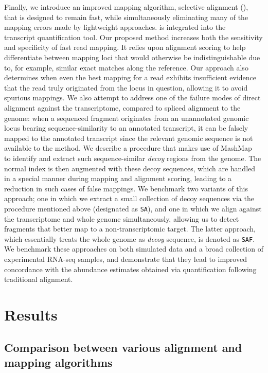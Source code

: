 Finally, we introduce an improved mapping algorithm, selective alignment (\hsa),
that is designed to remain fast, while simultaneously eliminating many of the
mapping errors made by lightweight approaches. \hsa is integrated into the \salmon~\cite{salmon}
transcript quantification tool. Our proposed method increases
both the sensitivity and specificity of fast read mapping. It relies upon
alignment scoring to help differentiate between mapping loci that would
otherwise be indistinguishable due to, for example, similar exact matches along
the reference. Our approach also determines when even the best mapping for a
read exhibits insufficient evidence that the read truly originated from the
locus in question, allowing it to avoid spurious mappings. 
We also attempt to address one of the failure modes of direct alignment against
  the transcriptome, compared to spliced alignment to the genome: when a sequenced fragment originates
  from an unannotated genomic locus bearing sequence-similarity to an annotated
  transcript, it can be falsely mapped to the annotated transcript since the
  relevant genomic sequence is not available to the method. We describe a procedure
  that makes use of MashMap~\cite{jain2018fast} to identify and extract such
  sequence-similar \emph{decoy} regions from the genome. The normal \salmon
  index is then augmented with these decoy sequences, which are handled in a
  special manner during mapping and alignment scoring, leading to a reduction in
  such cases of false mappings. We benchmark two variants of this approach; one in which
we extract a small collection of decoy sequences via the procedure mentioned
above (designated as \texttt{SA}), and one in which we align against the
transcriptome and whole genome simultaneously, allowing us to detect fragments
that better map to a non-transcriptomic target.  The latter approach, which 
essentially treats the whole genome as \emph{decoy} sequence, is denoted as 
\texttt{SAF}. We benchmark these approaches on both simulated data and a broad collection of
experimental RNA-seq samples, and demonstrate that they lead to improved
concordance with the abundance estimates obtained via quantification
following traditional alignment.


\section{Results}

\subsection{Comparison between various alignment and mapping algorithms}
\label{subsec:overview}

